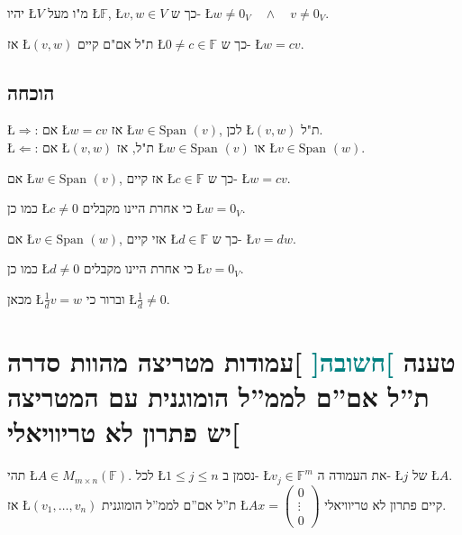 \documentclass[english,hebrew]{article}
\newcommand{\spn}{\text{Span }}
\begin{document}
יהיו \L{$V$} מ"ו מעל \L{$\mathbb{F}$}, \L{$v,w\in V$} כך ש- \L{$w\neq0_{V}\quad\wedge\quad v\neq0_{V}$}.

אז \L{$(v,w)$} ת"ל אם"ם קיים \L{$0\neq c\in\mathbb{F}$} כך ש-
\L{$w=cv$}.

\subsection{הוכחה}

\L{$\Rightarrow$}: אם \L{$w=cv$} אז \L{$w\in\spn(v)$}, לכן \L{$(v,w)$}
ת"ל.\\

\L{$\Leftarrow$}: אם \L{$(v,w)$} ת"ל, אז \L{$w\in\spn(v)$} או
\L{$v\in\spn(w)$}.

אם \L{$w\in\spn(v)$}, אז קיים \L{$c\in\mathbb{F}$} כך ש- \L{$w=cv$}.

כמו כן \L{$c\neq0$} כי אחרת היינו מקבלים \L{$w=0_{V}$}.

אם \L{$v\in\spn(w)$}, אזי קיים \L{$d\in\mathbb{F}$} כך ש- \L{$v=dw$}.

כמו כן \L{$d\neq0$} כי אחרת היינו מקבלים \L{$v=0_{V}$}.

מכאן \L{$\frac{1}{d}v=w$} וברור כי \L{$\frac{1}{d}\neq0$}.

\section{טענה \textcolor{teal}{{]}חשובה{[}} {]}עמודות מטריצה מהוות סדרה ת\textquotedblright ל
אם\textquotedblright ם לממ\textquotedblright ל הומוגנית עם המטריצה
יש פתרון לא טריוויאלי{[}}

תהי \L{$A\in M_{m\times n}(\mathbb{F})$}. לכל \L{$1\leq j\leq n$}
נסמן ב- \L{$v_{j}\in\mathbb{F}^{m}$} את העמודה ה- \L{$j$} של \L{$A$}.
אז \L{$(v_{1},\dots,v_{n})$} ת\textquotedblright ל אם\textquotedblright ם
לממ\textquotedblright ל הומוגנית \L{$Ax=\begin{pmatrix}0\\
\vdots\\
0
\end{pmatrix}$} קיים פתרון לא טריוויאלי.\\

\noindent{}
\end{document}
